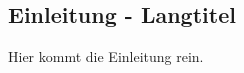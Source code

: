 \begin{showIntro}%
%
\chapter[Einleitung - Kurztitel für Inhaltsverzeichnis und Kolumnentitel]{Einleitung - Langtitel}%
\label{chap:Introduction}
%
Hier kommt die Einleitung rein.
%
%
\end{showIntro}%
